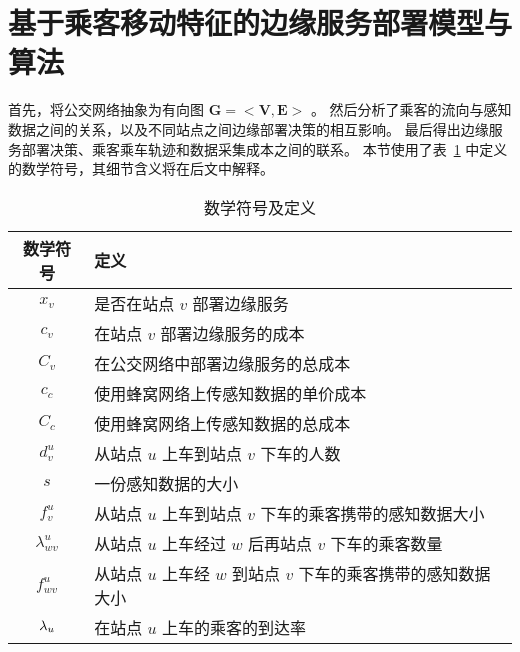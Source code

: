 \section{基于乘客移动特征的边缘服务部署模型与算法}

首先，将公交网络抽象为有向图 $\boldsymbol{G}=<\boldsymbol{V}, \boldsymbol{E}>$ 。
然后分析了乘客的流向与感知数据之间的关系，以及不同站点之间边缘部署决策的相互影响。
最后得出边缘服务部署决策、乘客乘车轨迹和数据采集成本之间的联系。
本节使用了表~\ref{table_notations_monet} 中定义的数学符号，其细节含义将在后文中解释。

\begin{table}[!t]
  \caption{数学符号及定义}
  \vspace{-1em}
  \label{table_notations_monet}
  \centering
  \begin{tabular}{|c|p{10.5cm}|}
    \hline
    \textbf{数学符号} & \textbf{定义}\\
    \hline
    $x_v$ & 是否在站点 $v$ 部署边缘服务\\\hline
    $c_v$ & 在站点 $v$ 部署边缘服务的成本\\\hline
    $C_v$ & 在公交网络中部署边缘服务的总成本\\\hline
    $c_c$ &  使用蜂窝网络上传感知数据的单价成本\\\hline
    $C_c$ &  使用蜂窝网络上传感知数据的总成本\\\hline
    $d_v^u$ & 从站点 $u$ 上车到站点 $v$ 下车的人数\\\hline
    $s$ & 一份感知数据的大小\\\hline
    $f_v^u$ & 从站点 $u$ 上车到站点 $v$ 下车的乘客携带的感知数据大小\\\hline
    $\lambda^u_{wv}$ & 从站点 $u$ 上车经过 $w$ 后再站点 $v$ 下车的乘客数量\\\hline
    $f_{wv}^u$ & 从站点 $u$ 上车经 $w$ 到站点 $v$ 下车的乘客携带的感知数据大小\\\hline
    ${\lambda}_{u}$ & 在站点 $u$ 上车的乘客的到达率\\\hline

\end{tabular}
\end{table}
